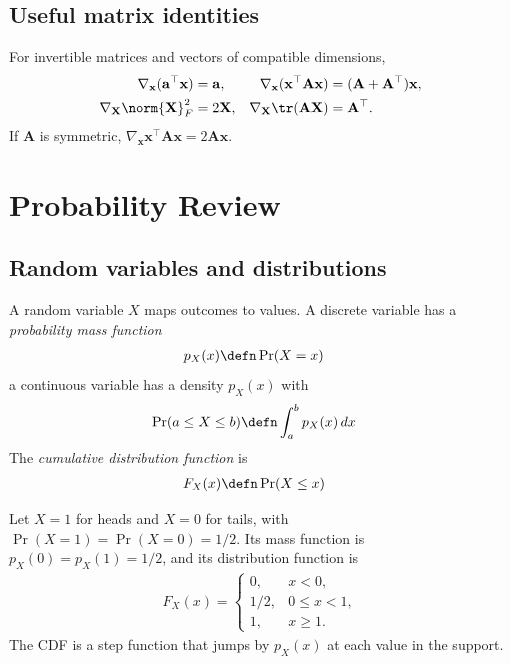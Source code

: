 \documentclass[a4paper, 12pt]{book}
\begin{document}
\section{Useful matrix identities}

For invertible matrices and vectors of compatible dimensions,
\begin{align}
    \nabla_{\mathbf{x}} (\mathbf{a}^\top \mathbf{x}) &= \mathbf{a}, &
    \nabla_{\mathbf{x}} (\mathbf{x}^\top \mathbf{A}\mathbf{x}) &= (\mathbf{A}+\mathbf{A}^\top)\mathbf{x},\\
    \nabla_{\mathbf{X}} \norm{\mathbf{X}}_F^2 &= 2\mathbf{X}, &
    \nabla_{\mathbf{X}} \tr(\mathbf{A}\mathbf{X}) &= \mathbf{A}^\top.
\end{align}
If $\mathbf{A}$ is symmetric, $\nabla_{\mathbf{x}} \mathbf{x}^\top \mathbf{A}\mathbf{x}
= 2\mathbf{A}\mathbf{x}$.

\chapter{Probability Review}
\label{ch:prob}

\section{Random variables and distributions}

A random variable $X$ maps outcomes to values. A discrete variable has a \emph{probability mass function}
\begin{align}
    p_X(x) &\defn \Pr(X=x)
\end{align}
a continuous variable has a density $p_X(x)$ with
\begin{align}
    \Pr(a \leq X \leq b) &\defn \int_a^b p_X(x)\,dx
\end{align}
The \emph{cumulative distribution function} is 
\begin{align}
    F_X(x) &\defn \Pr(X \leq x)    
\end{align}
\begin{example}
    Let $X=1$ for heads and $X=0$ for tails, with
    $\Pr(X=1)=\Pr(X=0)=1/2$. Its mass function is $p_X(0)=p_X(1)=1/2$, and its
    distribution function is
    \begin{align}
        F_X(x) =
        \begin{cases}
            0, & x < 0,\\
            1/2, & 0 \leq x < 1,\\
            1, & x \geq 1.
        \end{cases}
    \end{align}
    The CDF is a step function that jumps by $p_X(x)$ at each value in the
    support.
\end{example}
\end{document}
